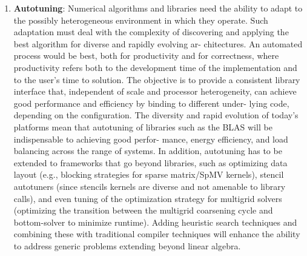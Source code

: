 \begin{enumerate}
	\item \textbf{Autotuning}: Numerical algorithms and libraries need the ability to adapt to the possibly heterogeneous environment in which they operate. Such adaptation must deal with the complexity of discovering and applying the best algorithm for diverse and rapidly evolving ar- chitectures. An automated process would be best, both for productivity and for correctness, where productivity refers both to the development time of the implementation and to the user’s time to solution. The objective is to provide a consistent library interface that, independent of scale and processor heterogeneity, can achieve good performance and efficiency by binding to different under- lying code, depending on the configuration. The diversity and rapid evolution of today’s platforms mean that autotuning of libraries such as the BLAS will be indispensable to achieving good perfor- mance, energy efficiency, and load balancing across the range of systems. In addition, autotuning has to be extended to frameworks that go beyond libraries, such as optimizing data layout (e.g., blocking strategies for sparse matrix/SpMV kernels), stencil autotuners (since stencils kernels are diverse and not amenable to library calls), and even tuning of the optimization strategy for multigrid solvers (optimizing the transition between the multigrid coarsening cycle and bottom-solver to minimize runtime). Adding heuristic search techniques and combining these with traditional compiler techniques will enhance the ability to address generic problems extending beyond linear algebra.
	

\end{enumerate}
